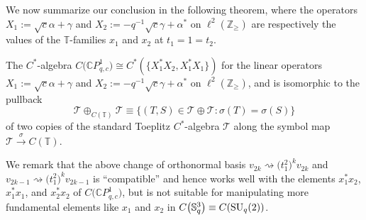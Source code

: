 We now summarize our conclusion in the following theorem, where the operators
$X_{1}:=\sqrt{c}\alpha+\gamma$ and $X_{2}:=-q^{-1}\sqrt{c}\gamma+\alpha^{\ast
}$ on $\ell^{2} ( \mathbb{Z}_{\geq} ) $ are respectively the values
of the $\mathbb{T}$-families $x_{1}$ and $x_{2}$ at $t_{1}=1=t_{2}$.

\begin{theorem}\label{final} The $C^*$-algebra $C\big( \mathbb{C}P_{q,c}^{1}\big)
\cong C^{\ast} ( \{ X_{1}^{\ast}X_{2},X_{1}^{\ast}X_{1} \}
 ) $ for the linear operators $X_{1}:=\sqrt{c}\alpha+\gamma$ and
$X_{2}:=-q^{-1}\sqrt{c}\gamma+\alpha^{\ast}$ on $\ell^{2} (
\mathbb{Z}_{\geq} ) $, and is isomorphic to the pullback
\[
\mathcal{T}\oplus_{C ( \mathbb{T} ) }\mathcal{T}\equiv\big\{
 ( T,S ) \in\mathcal{T}\oplus\mathcal{T}\colon \sigma(T)
=\sigma ( S ) \big\}
\]
of two copies of the standard Toeplitz $C^*$-algebra $\mathcal{T}$ along the
symbol map $\mathcal{T}\overset{\sigma}{\rightarrow}C( \mathbb{T})$.
\end{theorem}

We remark that the above change of orthonormal basis $v_{2k}\rightsquigarrow
\big( t_{1}^{2}\big) ^{k}v_{2k}$ and $v_{2k-1}\rightsquigarrow\big(
t_{1}^{2}\big) ^{k}v_{2k-1}$ is ``compatible'' and hence works well with the elements
$x_{1}^{\ast}x_{2}$, $x_{1}^{\ast}x_{1}$, and $x_{2}^{\ast}x_{2}$ of $C\big(
\mathbb{C}P_{q,c}^{1}\big) $, but is not suitable for manipulating more
fundamental elements like $x_{1}$ and $x_{2}$ in $C\big( \mathbb{S}_{q}^{3}\big) \equiv C( {\rm SU}_{q}(2)) $.
